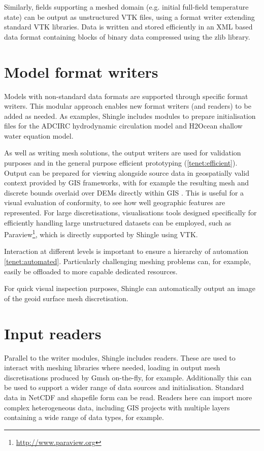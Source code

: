 \documentclass[a4paper, 10pt]{book}
\providecommand{\shingle}{Shingle\xspace}
\begin{document}
Similarly, fields supporting a meshed domain
(e.g. initial full-field temperature state)
can be output as unstructured VTK files, using a format writer extending standard VTK libraries.
Data is written and stored efficiently in an XML based data format containing blocks of binary data compressed using the zlib library.


\section{Model format writers}
%
%
Models with non-standard data formats are supported through specific format writers.
This modular approach enables new format writers (and readers) to be added as needed.
%
As examples, \shingle includes modules to prepare initialisation files for 
the ADCIRC hydrodynamic circulation model and H2Ocean shallow water equation model.

As well as writing mesh solutions, the output writers are used for validation purposes and in the general purpose efficient prototyping (\cref{tenet:efficient}).
Output can be prepared for viewing alongside source data in geospatially valid context provided by GIS frameworks, with for example the resulting mesh and discrete bounds overlaid over DEMs directly within GIS \citep[see][]{candygis}.
This is useful for a visual evaluation of conformity, to see how well geographic features are represented.
For large discretisations, visualisations tools designed specifically for efficiently handling large unstructured datasets can be employed, such as 
Paraview\footnote{\url{http://www.paraview.org}},
which is directly supported by \shingle using VTK.

Interaction at different levels is important to ensure a hierarchy of automation \cref{tenet:automated}.
Particularly challenging meshing problems can, for example, easily be offloaded to more capable dedicated resources.

For quick visual inspection purposes, \shingle can automatically output an image of the geoid surface mesh discretisation.


\section{Input readers}
%
Parallel to the writer modules, \shingle includes readers.
These are used to interact with meshing libraries where needed, loading in output mesh discretisations produced by Gmsh on-the-fly, for example.
%
Additionally this can be used to support a wider range of data sources and initialisation.
%
Standard data in NetCDF and shapefile form can be read.
Readers here can import more complex heterogeneous data, including GIS projects with multiple layers containing a wide range of data types, for example.
\end{document}
